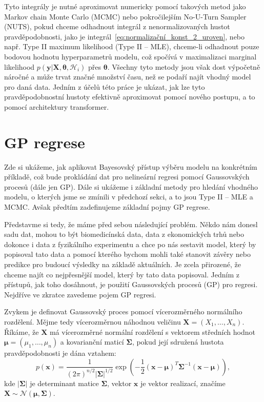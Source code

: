 Tyto integrály je nutné aproximovat numericky pomocí takových metod jako Markov chain Monte Carlo (MCMC) nebo pokročilejším No-U-Turn Sampler (NUTS), pokud chceme odhadnout integrál z nenormalizovaných hustot pravděpodobnosti, jako je integrál~\eqref{eq:normalizační_konst_2_uroven}, nebo např. Type II maximum likelihood (Type II – MLE), chceme-li odhadnout pouze bodovou hodnotu hyperparametrů modelu, což spočívá v maximalizaci marginal likelihood $p( \mathbf{y} | \mathbf{X}, \boldsymbol{\theta}, \mathcal{H}_i)$ přes $\boldsymbol{\theta}$.
Všechny tyto metody jsou však dost výpočetně náročné a může trvat značné množství času, než se podaří najít vhodný model pro daná data.
Jedním z účelů této práce je ukázat, jak lze tyto pravděpodobnostní hustoty efektivně aproximovat pomocí nového postupu, a to pomocí architektury transformer.

\section{GP regrese}
\label{sec:gp-regrese}
Zde si ukážeme, jak aplikovat Bayesovský přístup výběru modelu na konkrétním příkladě, což bude prokládání dat pro nelineární regresi pomocí Gaussovských procesů (dále jen GP).
Dále si ukážeme i základní metody pro hledání vhodného modelu, o kterých jsme se zmínili v předchozí sekci, a to jsou Type II – MLE a MCMC. 
Avšak předtím zadefinujeme základní pojmy GP regrese.
\par

Představme si tedy, že máme před sebou následující problém. 
Někdo nám donesl sadu dat, mohou to být biomedicínská data, data z ekonomických trhů nebo dokonce i data z fyzikálního experimentu a chce po nás sestavit model, který by popisoval tato data a pomocí kterého bychom mohli také stanovit závěry nebo predikce pro budoucí výsledky na základě aktuálních.
Je zcela přirozené, že chceme najít co nejpřesnější model, který by tato data popisoval.
Jedním z přístupů, jak toho dosáhnout, je použití Gaussovských procesů (GP) pro regresi.
Nejdříve ve zkratce zavedeme pojem GP regresi.
\par

Zvykem je definovat Gaussovský proces pomocí vícerozměrného normálního rozdělení.
Mějme tedy vícerozměrnou náhodnou veličinu $\mathbf{X} = (X_1, \dots, X_n)$.
Říkáme, že $\mathbf{X}$ má vícerozměrné normální rozdělení s vektorem středních hodnot $\boldsymbol{\mu} = (\mu_1, \dots, \mu_n)$ a kovarianční maticí $\boldsymbol{\Sigma}$, pokud její sdružená hustota pravděpodobnosti je dána vztahem:
\begin{equation}
  p(\mathbf{x}) = \frac{1}{(2\pi)^{n/2} |\boldsymbol{\Sigma}|^{1/2}} \exp\left( -\frac{1}{2} (\mathbf{x} - \boldsymbol{\mu})^T \boldsymbol{\Sigma}^{-1} (\mathbf{x} - \boldsymbol{\mu}) \right),
\label{eq:vicerozmernyGauss}
\end{equation}
kde $|\boldsymbol{\Sigma}|$ je determinant matice $\boldsymbol{\Sigma}$, vektor $\mathbf{x}$ je vektor realizací, značíme $\mathbf{X} \sim \mathcal{N}(\boldsymbol{\mu}, \boldsymbol{\Sigma})$.
\par

